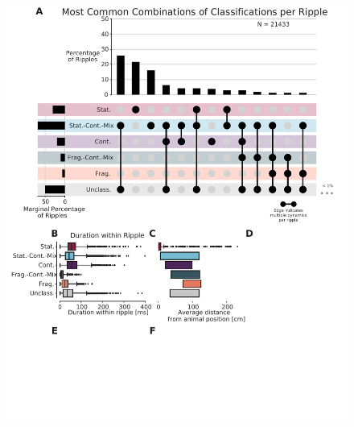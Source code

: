 \documentclass[9pt,lineno]{elife}
\providecommand{\DIFaddbeginFL}{} %
\providecommand{\DIFaddendFL}{} %
\providecommand{\DIFdelbeginFL}{} %
\providecommand{\DIFdelendFL}{} %
\newcommand{\DIFscaledelfig}{0.5}
\newlength{\DIFdelgraphicswidth} %
\newlength{\DIFdelgraphicsheight} %
\newcommand{\DIFaddincludegraphics}[2][]{{\color{blue}\fbox{\DIFOincludegraphics[#1]{#2}}}} %
\newcommand{\DIFdelincludegraphics}[2][]{%
\sbox{\DIFdelgraphicsbox}{\DIFOincludegraphics[#1]{#2}}%
\settoboxwidth{\DIFdelgraphicswidth}{\DIFdelgraphicsbox} %
\settoboxtotalheight{\DIFdelgraphicsheight}{\DIFdelgraphicsbox} %
\scalebox{\DIFscaledelfig}{%
\parbox[b]{\DIFdelgraphicswidth}{\usebox{\DIFdelgraphicsbox}\\[-\baselineskip] \rule{\DIFdelgraphicswidth}{0em}}\llap{\resizebox{\DIFdelgraphicswidth}{\DIFdelgraphicsheight}{%
\setlength{\unitlength}{\DIFdelgraphicswidth}%
\begin{picture}(1,1)%
\thicklines\linethickness{2pt} %
{\color[rgb]{1,0,0}\put(0,0){\framebox(1,1){}}}%
{\color[rgb]{1,0,0}\put(0,0){\line( 1,1){1}}}%
{\color[rgb]{1,0,0}\put(0,1){\line(1,-1){1}}}%
\end{picture}%
}\hspace*{3pt}}} %
} %
\DeclareRobustCommand{\DIFaddbeginFL}{\DIFOaddbeginFL \let\includegraphics\DIFaddincludegraphics} %
\DeclareRobustCommand{\DIFaddendFL}{\DIFOaddendFL \let\includegraphics\DIFOincludegraphics} %
\DeclareRobustCommand{\DIFdelbeginFL}{\DIFOdelbeginFL \let\includegraphics\DIFdelincludegraphics} %
\DeclareRobustCommand{\DIFdelendFL}{\DIFOaddendFL \let\includegraphics\DIFOincludegraphics} %
\begin{document}
\begin{figure}
\DIFdelbeginFL %
\DIFdelendFL \DIFaddbeginFL \includegraphics[width=0.80\linewidth]{figures/Figure5/Figure5_final}
\DIFaddendFL \caption{
}
\end{figure}
\end{document}

